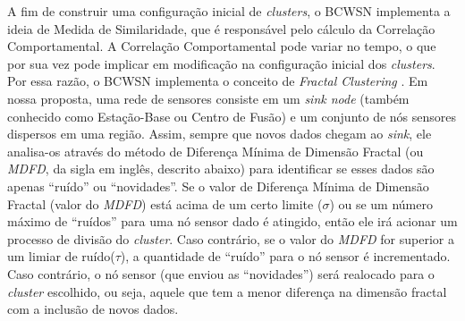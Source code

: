 \documentclass{acm_proc_article-sp}
\begin{document}
A fim de construir uma configuração inicial de {\it clusters}, o BCWSN
implementa a ideia de Medida de Similaridade, que é responsável pelo cálculo da
Correlação Comportamental. A Correlação Comportamental pode variar no tempo, o
que por sua vez pode implicar em modificação na configuração inicial dos {\it
clusters}.
Por essa razão, o BCWSN implementa o conceito de {\it Fractal Clustering}
\cite{Barbara2000}. Em nossa proposta, uma rede de sensores consiste em um {\it
sink node} (também conhecido como Estação-Base ou Centro de Fusão) e um conjunto
de nós sensores dispersos em uma região.
Assim, sempre que novos dados chegam ao {\it sink}, ele analisa-os através do
método de Diferença Mínima de Dimensão Fractal (ou {\it MDFD}, da sigla em
inglês, descrito abaixo) para identificar se esses dados são apenas ``ruído'' ou
``novidades''.
Se o valor de Diferença Mínima de Dimensão Fractal (valor do {\it MDFD}) está
acima de um certo limite ($\sigma$) ou se um número máximo de ``ruídos'' para
uma nó sensor dado é atingido, então ele irá acionar um processo de divisão do
{\it cluster}. Caso contrário, se o valor do {\it MDFD} for superior a um limiar
de ruído($\tau$), a quantidade de ``ruído'' para o nó sensor é incrementado.
Caso contrário, o nó sensor (que enviou as ``novidades'') será realocado para o
{\it cluster} escolhido, ou seja, aquele que tem a menor diferença na dimensão
fractal com a inclusão de novos dados.
\vspace*{-.3cm}
\end{document}
